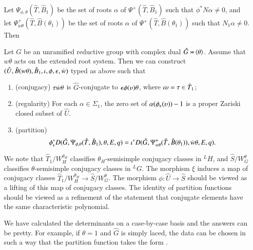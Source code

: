 Let $\Psi_{\phi,\theta}(\hat T,\hat B_1)$ be the set of roots $\alpha$ of
  $\Psi^+(\hat T,\hat B_1)$ such that $\phi^*N\alpha\ne 0$, and let
  $\Psi_{w\theta}^+(\hat T,\hat B(\theta_1))$ 
be the set of roots $\alpha$ of $\Psi^+(\hat T,\hat B(\theta_1))$ such
  that $N_1\alpha\ne0$.  Then

\begin{proposition}\label{lemma:ephi}
  Let $G$ be an unramified reductive group with complex dual $\hat
  G\rtimes \langle{\theta}\rangle$.  Assume that $w\theta$ acts on the extended
  root system.  Then we can construct $(\hat U,\hat B(w\theta),\hat
  B_1,\iota,\phi,\epsilon,\dot w)$ typed as above such that
\begin{enumerate}
\item (conjugacy) $\tau\dot w\theta$ is $\hat G$-conjugate to
  $\epsilon\phi(\upsilon) \theta$, where $\iota\upsilon = \tau\in\hat T_1$;
\item (regularity) For each $\alpha\in\Sigma_1$, the zero set of
  $\alpha(\phi_\epsilon(\upsilon))-1$ is a proper Zariski closed subset of $\hat U$.
\item (partition) 
\begin{equation}
\phi^*_\epsilon D(\hat G,\Psi_{\phi,\theta}(\hat T,\hat B_1),\theta,E,q) =\iota^* D(\hat G,\Psi_{w\theta}^+(\hat T,\hat B(\theta_1)),\dot w\theta,E,q).
\end{equation}
\end{enumerate}
\end{proposition}

We note that $\hat T_1/W_H^{\theta_H}$ classifies
$\theta_H$-semisimple conjugacy classes in ${}^LH$, and
$\hat S/W_G^{\theta}$ classifies $\theta$-semisimple conjugacy classes
in ${}^LG$.  The morphism $\xi$ induces a map of conjugacy classes
$\hat T_1/W_H^{\theta_H}\to \hat S/W_G^\theta$.  The morphism
$\phi:\hat U\to\hat S$ should be viewed as a lifting of this map of
conjugacy classes.  The identity of partition functions should be
viewed as a refinement of the statement that conjugate elements have
the same characteristic polynomial.

We have calculated the determinants on a case-by-case basis and
the answers can be pretty.  For example, if $\theta=1$ and $\hat G$ is
simply laced, the data can be chosen in such a way that the partition
function takes the form .

